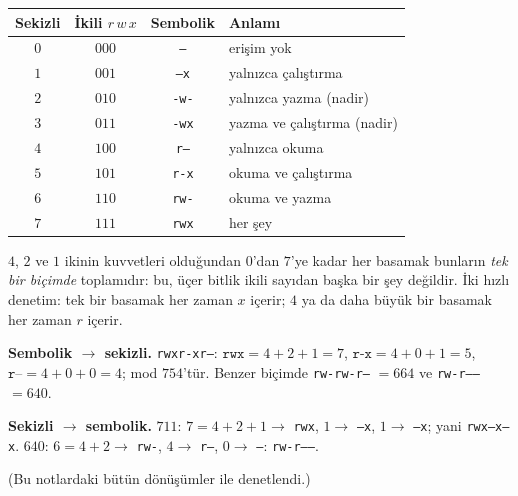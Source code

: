 \begin{center}
\small
\begin{tabular}{@{}c c c l@{}}
\toprule
\textbf{Sekizli} & \textbf{İkili} $r\,w\,x$ & \textbf{Sembolik} & \textbf{Anlamı} \\
\midrule
$0$ & $000$ & \texttt{---} & erişim yok \\
$1$ & $001$ & \texttt{--x} & yalnızca çalıştırma \\
$2$ & $010$ & \texttt{-w-} & yalnızca yazma (nadir) \\
$3$ & $011$ & \texttt{-wx} & yazma ve çalıştırma (nadir) \\
$4$ & $100$ & \texttt{r--} & yalnızca okuma \\
$5$ & $101$ & \texttt{r-x} & okuma ve çalıştırma \\
$6$ & $110$ & \texttt{rw-} & okuma ve yazma \\
$7$ & $111$ & \texttt{rwx} & her şey \\
\bottomrule
\end{tabular}
\end{center}

$4$, $2$ ve $1$ ikinin kuvvetleri olduğundan $0$'dan $7$'ye kadar her basamak bunların \emph{tek bir biçimde} toplamıdır: bu, üçer bitlik ikili sayıdan başka bir şey değildir. İki hızlı denetim: tek bir basamak her zaman $x$ içerir; $4$ ya da daha büyük bir basamak her zaman $r$ içerir.

\begin{example}
\textbf{Sembolik $\to$ sekizli.} \texttt{rwxr-xr--}: $\texttt{rwx} = 4+2+1 = 7$, $\texttt{r-x} = 4+0+1 = 5$, $\texttt{r--} = 4+0+0 = 4$; mod $754$'tür. Benzer biçimde \texttt{rw-rw-r--} $= 664$ ve \texttt{rw-r-----} $= 640$.

\textbf{Sekizli $\to$ sembolik.} $711$: $7 = 4+2+1 \to$ \texttt{rwx}, $1 \to$ \texttt{--x}, $1 \to$ \texttt{--x}; yani \texttt{rwx--x--x}. $640$: $6 = 4+2 \to$ \texttt{rw-}, $4 \to$ \texttt{r--}, $0 \to$ \texttt{---}: \texttt{rw-r-----}.

(Bu notlardaki bütün dönüşümler  ile denetlendi.)
\end{example}

